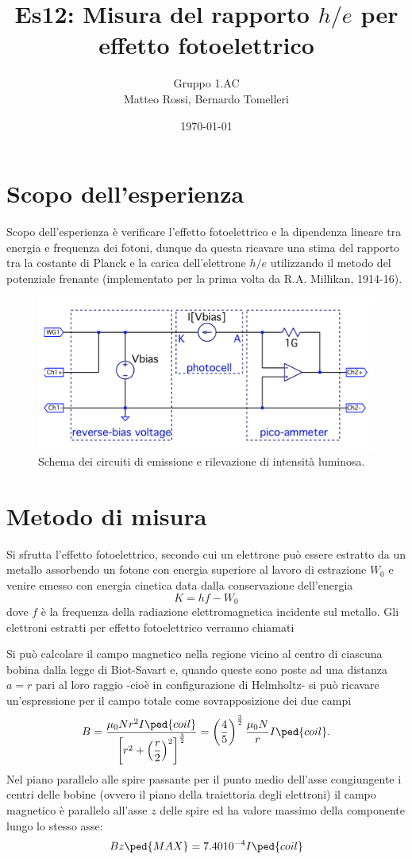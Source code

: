 \documentclass[10pt, a4paper, italian]{article}
\author{Gruppo 1.AC \\ Matteo Rossi, Bernardo Tomelleri}
\title{Es12: Misura del rapporto $h/e$ per effetto fotoelettrico}
\begin{document}
\date{\today}
\maketitle

\section{Scopo dell'esperienza}
Scopo dell'esperienza è verificare l'effetto fotoelettrico e la dipendenza
lineare tra energia e frequenza dei fotoni, dunque da questa ricavare una stima
del rapporto tra la costante di Planck e la carica dell'elettrone $h/e$
utilizzando il metodo del potenziale frenante (implementato per la prima volta
da R.A. Millikan, 1914-16).

\begin{figure}[htbp]
    \centering
	\includegraphics[scale=0.7]{schm}
    \caption{Schema dei circuiti di emissione e rilevazione di intensità
    luminosa.
    \label{schm: mesctrl}}
\end{figure}

\section{Metodo di misura}
Si sfrutta l'effetto fotoelettrico, secondo cui un elettrone può essere estratto da un metallo assorbendo un fotone con energia superiore al lavoro di estrazione $ W_{0} $ e venire emesso con energia cinetica data dalla conservazione dell'energia
\[ K = h f - W_{0} \]
dove $ f $ è la frequenza della radiazione elettromagnetica incidente sul metallo. Gli elettroni estratti per effetto fotoelettrico verranno chiamati

Si può calcolare il campo magnetico nella regione vicino al centro di ciascuna
bobina dalla legge di Biot-Savart e, quando queste sono poste ad una distanza
$a = r$ pari al loro raggio -cioè in configurazione di Helmholtz- si può
ricavare un'espressione per il campo totale come sovrapposizione dei due campi
\begin{equation}\label{eq: B-helm}
    B = \frac{\mu_0 N r^2 I\ped{coil}}{\left[r^2 + \left(\dfrac{r}{2}\right)^2
    \right]^\frac{3}{2}} =
    \left(\frac{4}{5}\right)^{\frac{3}{2}} \frac{\mu_{0} N}{r} I\ped{coil}.
\end{equation}
Nel piano parallelo alle spire passante per il punto medio dell'asse
congiungente i centri delle bobine (ovvero il piano della traiettoria degli
elettroni) il campo magnetico è parallelo all'asse $z$ delle spire ed ha
valore massimo della componente lungo lo stesso asse:
\[
Bz\ped{MAX} = 7.40 10^{-4} I\ped{coil}
\]
\end{document}
